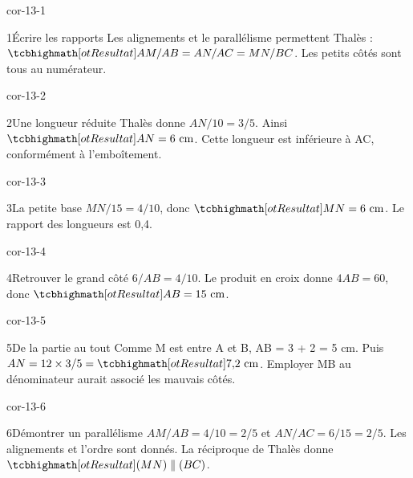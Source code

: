 \clearpage\pagestyle{otMain}\fontsize{11}{15}\selectfont{}
\begin{blocLivre}{cor-13-1}\begin{corrige}{1}{Écrire les rapports}
Les alignements et le parallélisme permettent Thalès : $\res{AM/AB=AN/AC=MN/BC}$. Les petits côtés sont tous au numérateur.
\label{fig-cor-13-1}
\end{corrige}\end{blocLivre}
\begin{blocLivre}{cor-13-2}\begin{corrige}{2}{Une longueur réduite}
Thalès donne $AN/10=3/5$. Ainsi $\res{AN=6\text{ cm}}$. Cette longueur est inférieure à AC, conformément à l’emboîtement.
\label{fig-cor-13-2}
\end{corrige}\end{blocLivre}
\begin{blocLivre}{cor-13-3}\begin{corrige}{3}{La petite base}
$MN/15=4/10$, donc $\res{MN=6\text{ cm}}$. Le rapport des longueurs est 0,4.
\label{fig-cor-13-3}
\end{corrige}\end{blocLivre}
\begin{blocLivre}{cor-13-4}\begin{corrige}{4}{Retrouver le grand côté}
$6/AB=4/10$. Le produit en croix donne $4AB=60$, donc $\res{AB=15\text{ cm}}$.
\label{fig-cor-13-4}
\end{corrige}\end{blocLivre}
\begin{blocLivre}{cor-13-5}\begin{corrige}{5}{De la partie au tout}
Comme M est entre A et B, AB = 3 + 2 = 5 cm. Puis $AN=12\times3/5=\res{7{,}2\text{ cm}}$. Employer MB au dénominateur aurait associé les mauvais côtés.
\label{fig-cor-13-5}
\end{corrige}\end{blocLivre}
\begin{blocLivre}{cor-13-6}\begin{corrige}{6}{Démontrer un parallélisme}
$AM/AB=4/10=2/5$ et $AN/AC=6/15=2/5$. Les alignements et l’ordre sont donnés. La réciproque de Thalès donne $\res{(MN)\parallel(BC)}$.
\label{fig-cor-13-6}
\end{corrige}\end{blocLivre}
